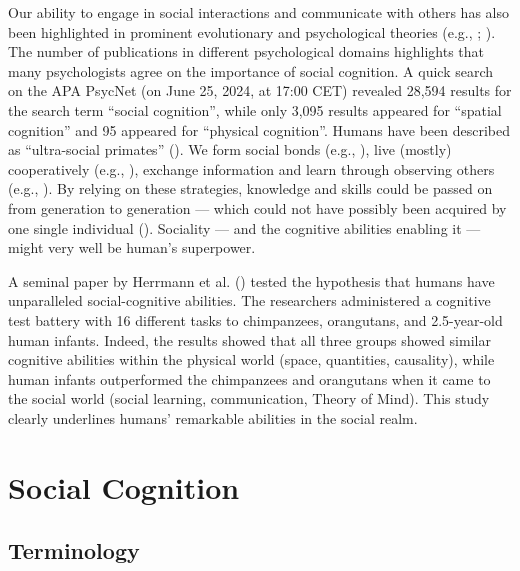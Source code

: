 \documentclass[
]{scrbook}
\begin{document}
Our ability to engage in social interactions and communicate with others has also been highlighted in prominent evolutionary and psychological theories (e.g., ; ). The number of publications in different psychological domains highlights that many psychologists agree on the importance of social cognition. A quick search on the APA PsycNet (on June 25, 2024, at 17:00 CET) revealed 28,594 results for the search term ``social cognition'', while only 3,095 results appeared for ``spatial cognition'' and 95 appeared for ``physical cognition''. Humans have been described as ``ultra-social primates'' (). We form social bonds (e.g., ), live (mostly) cooperatively (e.g., ), exchange information and learn through observing others (e.g., ). By relying on these strategies, knowledge and skills could be passed on from generation to generation --- which could not have possibly been acquired by one single individual (). Sociality --- and the cognitive abilities enabling it --- might very well be human's superpower.

A seminal paper by Herrmann et al. () tested the hypothesis that humans have unparalleled social-cognitive abilities. The researchers administered a cognitive test battery with 16 different tasks to chimpanzees, orangutans, and 2.5-year-old human infants. Indeed, the results showed that all three groups showed similar cognitive abilities within the physical world (space, quantities, causality), while human infants outperformed the chimpanzees and orangutans when it came to the social world (social learning, communication, Theory of Mind). This study clearly underlines humans' remarkable abilities in the social realm.

\section{Social Cognition}\label{social-cognition}

\subsection{Terminology}\label{terminology}
\end{document}
